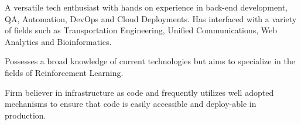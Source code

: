 

\begin{cvparagraph}

A versatile tech enthusiast with hands on experience in back-end development, QA, Automation, DevOps and Cloud Deployments. Has interfaced with a variety of fields such as Transportation Engineering, Unified Communications, Web Analytics and Bioinformatics.

Possesses a broad knowledge of current technologies but aims to specialize in the fields of Reinforcement Learning.

Firm believer in infrastructure as code and frequently utilizes well adopted mechanisms to ensure that code is easily accessible and deploy-able in production.

\end{cvparagraph}
